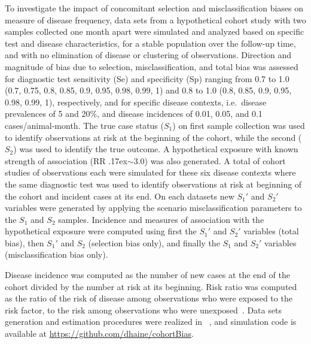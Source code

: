 To investigate the impact of concomitant selection and misclassification biases
on measure of disease frequency, data sets from a hypothetical cohort study with
two samples collected one month apart were simulated and analyzed based on
specific test and disease characteristics, for a stable population over the
follow-up time, and with no elimination of disease or clustering of
observations.
Direction and magnitude of bias due to selection, misclassification, and total
bias was assessed for diagnostic test sensitivity (Se) and specificity (Sp)
ranging from 0.7 to 1.0 (0.7, 0.75, 0.8, 0.85, 0.9, 0.95, 0.98, 0.99, 1) and 0.8
to 1.0 (0.8, 0.85, 0.9, 0.95, 0.98, 0.99, 1), respectively, and for specific
disease contexts, i.e.\ disease prevalences of 5 and 20\%, and disease
incidences of 0.01, 0.05, and 0.1 cases/animal-month.
The true case status (\(S_1\)) on first sample collection was used to identify
observations at risk at the beginning of the cohort, while the second (\(S_2\))
was used to identify the true outcome.
A hypothetical exposure with known strength of association (RR
\raise.17ex\hbox{$\scriptstyle\sim$}\num{3.0}) was also generated.
A total of  cohort studies of  observations each
were simulated for these six disease contexts where the same diagnostic test was
used to identify observations at risk at beginning of the cohort and incident
cases at its end.
On each datasets new \(S_{1}'\) and \(S_{2}'\) variables were generated by
applying the scenario misclassification parameters to the \(S_1\) and \(S_2\)
samples.
Incidence and measures of association with the hypothetical exposure were
computed using first the \(S_{1}'\) and \(S_{2}'\) variables (total bias), then
\(S_{1}'\) and \(S_2\) (selection bias only), and finally the \(S_1\) and
\(S_{2}'\) variables (misclassification bias only).

Disease incidence was computed as the number of new cases at the end of the
cohort divided by the number at risk at its beginning.
Risk ratio was computed as the  ratio of the risk of disease among observations
who were exposed to the risk factor, to the risk among observations who were
unexposed~\citep{Rothman2012}.
Data sets generation and estimation procedures were realized in
\R~\citep{Rsystem}, and simulation code is available at
\url{https://github.com/dhaine/cohortBias}.

